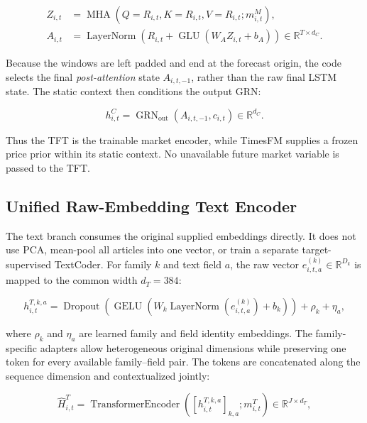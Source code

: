 \documentclass[11pt]{article}
\newcommand{\R}{\mathbb{R}}
\begin{document}
\begin{align}
Z_{i,t}
&=
\operatorname{MHA}
\left(
Q=R_{i,t},
K=R_{i,t},
V=R_{i,t};
m^M_{i,t}
\right),\\
A_{i,t}
&=
\operatorname{LayerNorm}
\left(
R_{i,t}
+
\operatorname{GLU}(W_A Z_{i,t}+b_A)
\right)
\in\R^{T\times d_C}.
\end{align}

Because the windows are left padded and end at the forecast origin, the code
selects the final \emph{post-attention} state $A_{i,t,-1}$, rather than the raw
final LSTM state. The static context then conditions the output GRN:

\begin{equation}
h^C_{i,t}
=
\operatorname{GRN}_{\mathrm{out}}
\left(
A_{i,t,-1},
c_{i,t}
\right)
\in\R^{d_C}.
\end{equation}

Thus the TFT is the trainable market encoder, while TimesFM supplies a frozen
price prior within its static context. No unavailable future market variable
is passed to the TFT.

\subsection{Unified Raw-Embedding Text Encoder}

The text branch consumes the original supplied embeddings directly. It does
not use PCA, mean-pool all articles into one vector, or train a separate
target-supervised TextCoder. For family $k$ and text field $a$, the raw vector
$e^{(k)}_{i,t,a}\in\R^{D_k}$ is mapped to the common width $d_T=384$:

\begin{equation}
h^{T,k,a}_{i,t}
=
\operatorname{Dropout}\!\left(
\operatorname{GELU}\!\left(
W_k\operatorname{LayerNorm}(e^{(k)}_{i,t,a})+b_k
\right)
\right)
+\rho_k+\eta_a,
\end{equation}

where $\rho_k$ and $\eta_a$ are learned family and field identity embeddings.
The family-specific adapters allow heterogeneous original dimensions while
preserving one token for every available family--field pair. The tokens are
concatenated along the sequence dimension and contextualized jointly:

\begin{equation}
\widehat H^T_{i,t}
=
\operatorname{TransformerEncoder}
\left(
[h^{T,k,a}_{i,t}]_{k,a};
m^T_{i,t}
\right)
\in\R^{J\times d_T},
\end{equation}
\end{document}
